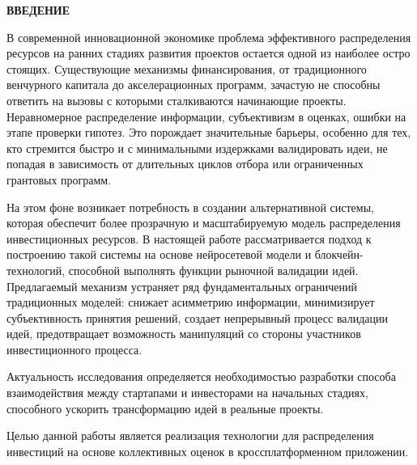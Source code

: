 \documentclass[
    14pt,
    specialist,
    candidate, %
    subf, %
    href,
    dotsinheaders=false
]{disser}
\let\oldtableofcontents\tableofcontents
\renewcommand{\tableofcontents}{
    \begingroup
    \pagestyle{plain}
    \oldtableofcontents
    \endgroup
  }
\newcommand{\myunnumberedchapter}[1]{%
  \newpage
  \hypertarget{chap:#1}{}%
  \begin{center}
    \textbf{\MakeUppercase{#1}}
  \end{center}
  \addcontentsline{toc}{chapter}{\texorpdfstring{#1}{#1}}%
}
\begin{document}
\sloppy



\thispagestyle{fancy}
\renewcommand{\contentsname}{\centerline{\normalsize\bfseries\centerline{\textbf{\MakeUppercase{СОДЕРЖАНИЕ}}}}}
\setcounter{tocdepth}{1}

\begingroup
\pagestyle{fancy}
\tableofcontents
\endgroup

\myunnumberedchapter{ВВЕДЕНИЕ}

В современной инновационной экономике проблема эффективного распределения ресурсов на ранних стадиях развития проектов остается одной из наиболее остро стоящих. Существующие механизмы финансирования, от традиционного венчурного капитала до акселерационных программ, зачастую не способны ответить на вызовы с которыми сталкиваются начинающие проекты. Неравномерное распределение информации, субъективизм в оценках, ошибки на этапе проверки гипотез. Это порождает значительные барьеры, особенно для тех, кто стремится быстро и с минимальными издержками валидировать идеи, не попадая в зависимость от длительных циклов отбора или ограниченных грантовых программ.

На этом фоне возникает потребность в создании альтернативной системы, которая обеспечит более прозрачную и масштабируемую модель распределения инвестиционных ресурсов. В настоящей работе рассматривается подход к построению такой системы на основе нейросетевой модели и блокчейн-технологий, способной выполнять функции рыночной валидации идей. Предлагаемый механизм устраняет ряд фундаментальных ограничений традиционных моделей: снижает асимметрию информации, минимизирует субъективность принятия решений, создает непрерывный процесс валидации идей, предотвращает возможность манипуляций со стороны участников инвестиционного процесса.

Актуальность исследования определяется необходимостью разработки способа взаимодействия между стартапами и инвесторами на начальных стадиях, способного ускорить трансформацию идей в реальные проекты.

Целью данной работы является реализация технологии для распределения инвестиций на основе коллективных оценок в кроссплатформенном приложении.
\end{document}
